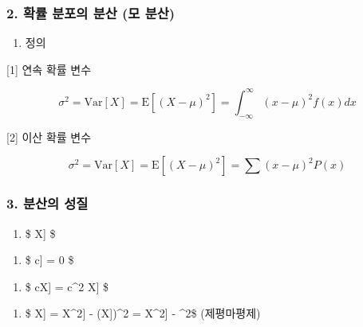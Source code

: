 \documentclass[11pt]{article}
\providecommand{\tightlist}{%
      \setlength{\itemsep}{0pt}\setlength{\parskip}{0pt}}
\begin{document}
    \hypertarget{uxd655uxb960-uxbd84uxd3ecuxc758-uxbd84uxc0b0-uxbaa8-uxbd84uxc0b0}{%
\subsubsection{2. 확률 분포의 분산 (모
분산)}\label{uxd655uxb960-uxbd84uxd3ecuxc758-uxbd84uxc0b0-uxbaa8-uxbd84uxc0b0}}

    \begin{enumerate}
\def\labelenumi{\arabic{enumi})}
\tightlist
\item
  정의
\end{enumerate}

    {[}1{]} 연속 확률 변수

\[ \sigma^2 = \text{Var}[X] = \text{E}[(X - \mu)^2] = \int_{-\infty}^{\infty} (x - \mu)^2 f(x)dx\]

    {[}2{]} 이산 확률 변수

\[ \sigma^2 = \text{Var}[X] = \text{E}[(X - \mu)^2] =  \sum (x - \mu)^2 P(x) \]

    \hypertarget{uxbd84uxc0b0uxc758-uxc131uxc9c8}{%
\subsubsection{3. 분산의 성질}\label{uxbd84uxc0b0uxc758-uxc131uxc9c8}}

    \begin{enumerate}
\def\labelenumi{\arabic{enumi})}
\tightlist
\item
  \$ \text{Var}{[}X{]}  \$
\end{enumerate}

    \begin{enumerate}
\def\labelenumi{\arabic{enumi})}
\setcounter{enumi}{1}
\tightlist
\item
  \$ \text{Var}{[}c{]} = 0 \$
\end{enumerate}

    \begin{enumerate}
\def\labelenumi{\arabic{enumi})}
\setcounter{enumi}{2}
\tightlist
\item
  \$ \text{Var}{[}cX{]} = c\^{}2 \text{Var}{[}X{]} \$
\end{enumerate}

    \begin{enumerate}
\def\labelenumi{\arabic{enumi})}
\setcounter{enumi}{3}
\tightlist
\item
  \$ \text{Var}{[}X{]} = \text{E}{[}X\^{}2{]} - (\text{E}{[}X{]})\^{}2 =
  \text{E}{[}X\^{}2{]} - \mu\^{}2\$ (제평마평제)
\end{enumerate}
\end{document}
